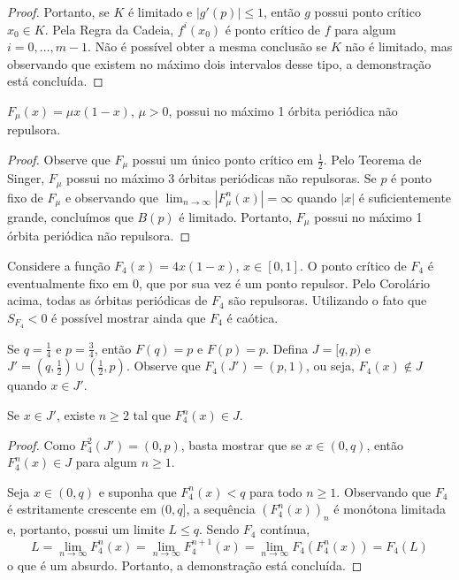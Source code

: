 \begin{proof}
Portanto, se $K$ é limitado e $|g'(p)| \leq 1$, então $g$ possui ponto crítico $x_0 \in K$. Pela Regra da Cadeia, $f^i(x_0)$ é ponto crítico de $f$ para algum $i = 0, \dots, m-1$. Não é possível obter a mesma conclusão se $K$ não é limitado, mas observando que existem no máximo dois intervalos desse tipo, a demonstração está concluída.
\end{proof}

\begin{corollary}
$F_\mu(x) = \mu x(1-x)$, $\mu > 0$, possui no máximo 1 órbita periódica não repulsora.
\end{corollary}

\begin{proof}
Observe que $F_\mu$ possui um único ponto crítico em $\frac{1}{2}$. Pelo Teorema de Singer, $F_\mu$ possui no máximo 3 órbitas periódicas não repulsoras. Se $p$ é ponto fixo de $F_\mu$ e observando que $\lim_{n \to\infty} |F^n_\mu(x)| = \infty$ quando $|x|$ é suficientemente grande, concluímos que $B(p)$ é limitado. Portanto, $F_\mu$ possui no máximo 1 órbita periódica não repulsora.
\end{proof}

Considere a função $F_4(x) = 4x(1-x)$, $x \in [0,1]$. O ponto crítico de $F_4$ é eventualmente fixo em 0, que por sua vez é um ponto repulsor. Pelo Corolário acima, todas as órbitas periódicas de $F_4$ são repulsoras. Utilizando o fato que $S_{F_4} < 0$ é possível mostrar ainda que $F_4$ é caótica. 

Se $q=\frac{1}{4}$ e $p=\frac{3}{4}$, então $F(q)=p$ e $F(p)=p$. Defina $J = [q, p)$ e $J' = \left( q,\frac{1}{2} \right) \cup \left( \frac{1}{2}, p \right)$. Observe que $F_4(J') = \left ( p ,1 \right )$, ou seja, $F_4(x) \notin J$ quando $x \in J'$.

\begin{affirmation}
Se $x \in J'$, existe $n \geq 2$ tal que $F_4^n(x) \in J$.
\end{affirmation}

\begin{proof}
Como $F_4^2(J') = (0, p)$, basta mostrar que se $x \in (0, q)$, então $F_4^n(x) \in J$ para algum $n \geq 1$.

Seja $x \in (0,q)$ e suponha que $F_4^n(x) < q$ para todo $n \geq 1$. Observando que $F_4$ é estritamente crescente em $(0,q]$, a sequência $(F_4^n(x))_n$ é monótona limitada e, portanto, possui um limite $L \leq q$. Sendo $F_4$ contínua,
$$L = \lim_{n \to \infty} F_4^n(x) = \lim_{n \to \infty} F_4^{n+1}(x) = \lim_{n \to \infty} F_4(F_4^n(x)) = F_4(L)$$
o que é um absurdo. Portanto, a demonstração está concluída.
\end{proof}

